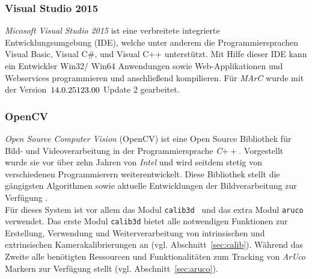 \subsubsection{Visual Studio 2015}\label{sec:VisualStudio}%
\textit{Micosoft Visual Studio 2015} ist eine verbreitete integrierte Entwicklungsumgebung (IDE), welche unter anderem die Programmiersprachen Visual Basic, Visual C$\#$, und Visual C++ unterstützt. Mit Hilfe dieser IDE kann ein Entwickler Win32/ Win64 Anwendungen sowie Web-Applikationen und Webservices \cite{website:VisuStud} programmieren und anschließend kompilieren. Für \textit{MArC} wurde mit der Version~$14.0.\-25123.00$ Update $2$ gearbeitet.

\subsubsection{OpenCV}\label{sec:OpenCV}%
\textit{Open Source Computer Vision} (OpenCV) ist eine Open Source Bibliothek für Bild- und Videoverarbeitung in der Programmiersprache \textit{C}$++$. Vorgestellt wurde sie vor über zehn Jahren von \textit{Intel} und wird seitdem stetig von verschiedenen Programmierern weiterentwickelt. Diese Bibliothek stellt die gängigsten Algorithmen sowie aktuelle Entwicklungen der Bildverarbeitung zur Verfügung
\cite{article:OpenCV}.\\
Für dieses System ist vor allem das Modul \texttt{calib3d}~\cite{website:Calib3dDoc} und das extra Modul \texttt{aruco}~\cite{website:ArucoDoc} verwendet. Das erste Modul \texttt{calib3d}  bietet alle notwendigen Funktionen zur Erstellung, Verwendung und Weiterverarbeitung von intrinsischen und extrinsischen Kamerakalibrierungen an (vgl. Abschnitt~\ref{sec:calib}). Während das Zweite alle benötigten Ressourcen und Funktionalitäten zum Tracking von \textit{ArUco} Markern zur Verfügung stellt (vgl. Abschnitt~\ref{sec:aruco}).

